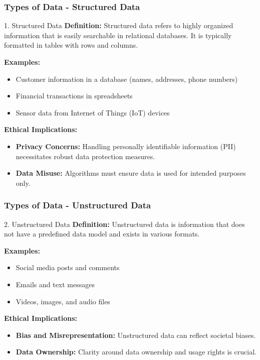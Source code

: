 \documentclass[aspectratio=169]{beamer}
\begin{document}
\begin{frame}[fragile]
    \frametitle{Types of Data - Structured Data}
    \begin{block}{1. Structured Data}
        \textbf{Definition:} Structured data refers to highly organized information that is easily searchable in relational databases. It is typically formatted in tables with rows and columns.
        
        \textbf{Examples:}
        \begin{itemize}
            \item Customer information in a database (names, addresses, phone numbers)
            \item Financial transactions in spreadsheets
            \item Sensor data from Internet of Things (IoT) devices
        \end{itemize}
        
        \textbf{Ethical Implications:}
        \begin{itemize}
            \item \textbf{Privacy Concerns:} Handling personally identifiable information (PII) necessitates robust data protection measures.
            \item \textbf{Data Misuse:} Algorithms must ensure data is used for intended purposes only.
        \end{itemize}
    \end{block}
\end{frame}

\begin{frame}[fragile]
    \frametitle{Types of Data - Unstructured Data}
    \begin{block}{2. Unstructured Data}
        \textbf{Definition:} Unstructured data is information that does not have a predefined data model and exists in various formats.
        
        \textbf{Examples:}
        \begin{itemize}
            \item Social media posts and comments
            \item Emails and text messages
            \item Videos, images, and audio files
        \end{itemize}
        
        \textbf{Ethical Implications:}
        \begin{itemize}
            \item \textbf{Bias and Misrepresentation:} Unstructured data can reflect societal biases.
            \item \textbf{Data Ownership:} Clarity around data ownership and usage rights is crucial.
        \end{itemize}
    \end{block}
\end{frame}
\end{document}
